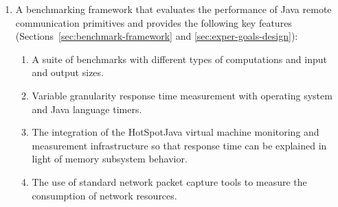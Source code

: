 \documentclass{sig-alternate}
\begin{document}


\begin{enumerate}

\setlength{\itemsep}{0in}
 \setlength{\topsep}{0in}
 \setlength{\partopsep}{0in}

\item A benchmarking framework that evaluates the performance of Java
  remote communication primitives and provides the following key
  features (Sections~\ref{sec:benchmark-framework} and
  \ref{sec:exper-goals-design}):

\begin{enumerate}

\setlength{\itemsep}{0in}
 \setlength{\topsep}{0in}
 \setlength{\partopsep}{0in}


\item A suite of benchmarks with different types of computations and
  input and output sizes.

\item Variable granularity response time measurement with operating
  system and Java language timers.

\item The integration of the HotSpot\texttrademark Java virtual
  machine monitoring and measurement infrastructure so that response
  time can be explained in light of memory subsystem behavior.

\item The use of standard network packet capture tools to measure the
  consumption of network resources.



\end{enumerate}
\end{enumerate}
\end{document}
